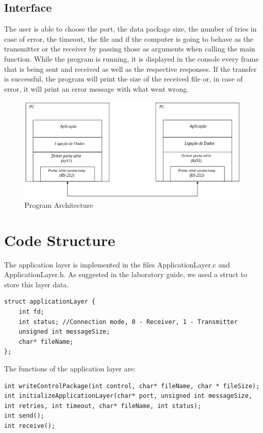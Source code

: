 \documentclass[a4paper]{article}
\begin{document}
\subsection{Interface}
The user is able to choose the port, the data package size, the number of tries in case of error, the timeout, the file and if the computer is going to behave as the transmitter or the receiver by passing those as arguments when calling the main function. While the program is running, it is displayed in the console every frame that is being sent and received as well as the respective responses. If the transfer is successful, the program will print the size of the received file or, in case of error, it will print an error message with what went wrong. 

\begin{figure}[h!]
	\centering
	\includegraphics[width=1\textwidth]{Architecture.png}
	\caption{Program Architecture}
	\label{Image: Program Architecture}
\end{figure}

\section{Code Structure}
The application layer is implemented in the files ApplicationLayer.c and ApplicationLayer.h. As suggested in the laboratory guide, we used a struct to store this layer data.

\begin{lstlisting}
struct applicationLayer {
    int fd;
    int status; //Connection mode, 0 - Receiver, 1 - Transmitter
    unsigned int messageSize;
    char* fileName;
};
\end{lstlisting}

The functions of the application layer are:

\begin{lstlisting}
int writeControlPackage(int control, char* fileName, char * fileSize);
int initializeApplicationLayer(char* port, unsigned int messageSize, int retries, int timeout, char* fileName, int status);
int send();
int receive();
\end{lstlisting}
\end{document}

